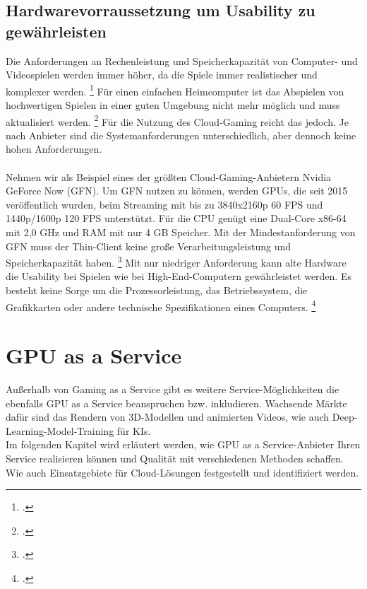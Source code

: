 \documentclass[12pt,toc=bib,toc=listof]{scrreprt}
\begin{document}
\section{Hardwarevorraussetzung um Usability zu gewährleisten}
\label{sec:Hardwarevorraussetzung um Usability zu gewährleisten}

Die Anforderungen an Rechenleistung und Speicherkapazität von Computer- und Videospielen werden immer höher, da die Spiele immer realistischer und komplexer werden. \footcite [Vgl.] [] {Laulajainen.2006} Für einen einfachen Heimcomputer ist das 
Abspielen von hochwertigen Spielen in einer guten Umgebung nicht mehr möglich und muss aktualisiert werden. \footcite [Vgl.] [] {Suznjevic.2016} Für die Nutzung des Cloud-Gaming reicht das jedoch. Je nach Anbieter sind die Systemanforderungen 
unterschiedlich, aber dennoch keine hohen Anforderungen. 
\\ \\
Nehmen wir als Beispiel eines der größten Cloud-Gaming-Anbietern Nvidia GeForce Now (GFN). Um GFN nutzen zu können, werden GPUs, die seit 2015 veröffentlich wurden, beim Streaming mit 
bis zu 3840x2160p 60 FPS und 1440p/1600p 120 FPS unterstützt. Für die CPU genügt eine Dual-Core x86-64 mit 2,0 GHz und RAM mit nur 4 GB Speicher. Mit der Mindestanforderung von GFN muss der Thin-Client keine große Verarbeitungsleistung und 
Speicherkapazität haben. \footcite [Vgl.] [] {Clement.2022} 
Mit nur niedriger Anforderung kann alte Hardware die Usability bei Spielen wie bei High-End-Computern gewährleistet werden. Es besteht keine Sorge um die Prozessorleistung, das Betriebssystem, die Grafikkarten oder andere technische 
Spezifikationen eines Computers. \footcite [Vgl.] [] {Ojala.2011}

\chapter{GPU as a Service}
\label{sec:GPU as a Service}

Außerhalb von Gaming as a Service gibt es weitere Service-Möglichkeiten die ebenfalls GPU as a 
Service beanspruchen bzw. inkludieren. Wachsende Märkte dafür sind
das Rendern von 3D-Modellen und animierten Videos, 
wie auch Deep-Learning-Model-Training für KIs. 
\\Im folgenden Kapitel wird erläutert werden, wie GPU as a Service-Anbieter Ihren Service 
realisieren können und Qualität mit verschiedenen Methoden schaffen. Wie auch Einsatzgebiete 
für Cloud-Lösungen festgestellt und identifiziert werden.
\end{document}

